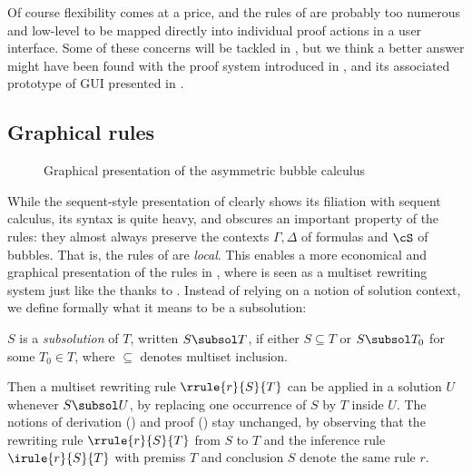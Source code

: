 Of course flexibility comes at a price, and the rules of  are probably
too numerous and low-level to be mapped directly into individual proof actions
in a user interface. Some of these concerns will be tackled in
, but we think a better answer might have been found with
the proof system introduced in , and its associated prototype of
GUI presented in .


\subsection{Graphical rules}

\begin{figure*}
  
  \caption{Graphical presentation of the asymmetric bubble calculus }
\end{figure*}

While the sequent-style presentation of  clearly shows its filiation
with sequent calculus, its syntax is quite heavy, and obscures an important
property of the rules: they almost always preserve the contexts $\Gamma, \Delta$
of formulas and $\cS$ of bubbles. That is, the rules of  are
\emph{local}. This enables a more economical and graphical presentation of the
rules in , where  is seen as a multiset rewriting
system just like the {\cham} thanks to . Instead of relying on
a notion of solution context, we define formally what it means to be a
subsolution:

\begin{definition}[Subsolution]
  $S$ is a \emph{subsolution} of $T$, written $S \subsol T$, if either $S
  \subseteq T$ or $S \subsol T_0$ for some $T_0 \in T$, where $\subseteq$
  denotes multiset inclusion. 
\end{definition}

Then a multiset rewriting rule $\rrule{r}{S}{T}$ can be applied in a
solution $U$ whenever $S \subsol U$, by replacing one occurrence of $S$ by $T$
inside $U$. The notions of derivation () and proof
() stay unchanged, by observing that the rewriting rule
$\rrule{r}{S}{T}$ from $S$ to $T$ and the inference rule
$\irule{r}{S}{T}$ with premiss $T$ and conclusion $S$ denote the same
rule $r$.

